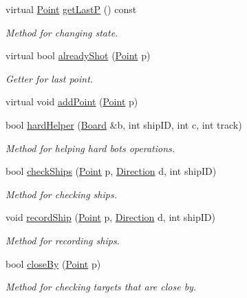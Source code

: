 \begin{DoxyCompactItemize}
virtual \mbox{\hyperlink{class_point}{Point}} \mbox{\hyperlink{class_hard_player_ad86f7d42434ae5526d7a1ca4ea65b51a}{get\+LastP}} () const
\begin{DoxyCompactList}\small\item\em Method for changing state. \end{DoxyCompactList}\item 
virtual bool \mbox{\hyperlink{class_hard_player_a8107a94c8db7d5f1023dbeeddfaaedb2}{already\+Shot}} (\mbox{\hyperlink{class_point}{Point}} p)
\begin{DoxyCompactList}\small\item\em Getter for last point. \end{DoxyCompactList}\item 
virtual void \mbox{\hyperlink{class_hard_player_a77c82c1a36c9e956fdab98837ed888e5}{add\+Point}} (\mbox{\hyperlink{class_point}{Point}} p)
\item 
bool \mbox{\hyperlink{class_hard_player_aec6ff0ed3ef8f47ac46d374cff89e6be}{hard\+Helper}} (\mbox{\hyperlink{class_board}{Board}} \&b, int ship\+ID, int c, int track)
\begin{DoxyCompactList}\small\item\em Method for helping hard bot\textquotesingle{}s operations. \end{DoxyCompactList}\item 
bool \mbox{\hyperlink{class_hard_player_aebad1f5ad6f9ac20eb4f1ca639088c7b}{check\+Ships}} (\mbox{\hyperlink{class_point}{Point}} p, \mbox{\hyperlink{_globals_8h_a224b9163917ac32fc95a60d8c1eec3aa}{Direction}} d, int ship\+ID)
\begin{DoxyCompactList}\small\item\em Method for checking ships. \end{DoxyCompactList}\item 
void \mbox{\hyperlink{class_hard_player_a9358a28f7f0e618d3c98aba7b135e6a8}{record\+Ship}} (\mbox{\hyperlink{class_point}{Point}} p, \mbox{\hyperlink{_globals_8h_a224b9163917ac32fc95a60d8c1eec3aa}{Direction}} d, int ship\+ID)
\begin{DoxyCompactList}\small\item\em Method for recording ships. \end{DoxyCompactList}\item 
bool \mbox{\hyperlink{class_hard_player_a91cdd6239e111ea02bff561f6a3a0c41}{close\+By}} (\mbox{\hyperlink{class_point}{Point}} p)
\begin{DoxyCompactList}\small\item\em Method for checking target\textquotesingle{}s that are close by. \end{DoxyCompactList}\end{DoxyCompactItemize}


